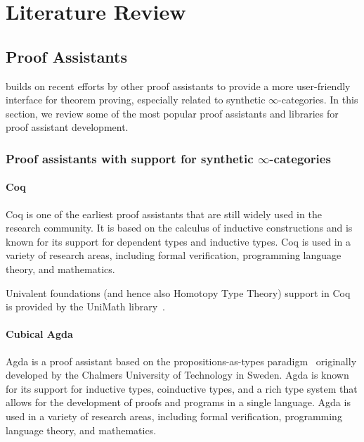 \chapter{Literature Review}
\label{chap:lr}

\section{Proof Assistants}

\Rzk{} builds on recent efforts by other proof assistants to provide a more user-friendly interface for theorem proving,
especially related to synthetic $\infty$-categories.
In this section, we review some of the most popular proof assistants and libraries for proof assistant development.

\subsection{Proof assistants with support for synthetic $\infty$-categories}

\subsubsection{Coq}

Coq \cite{huet1997coq} is one of the earliest proof assistants that are still widely used in the research community.
It is based on the calculus of inductive constructions and is known for its support for dependent types and inductive types.
Coq is used in a variety of research areas, including formal verification, programming language theory, and mathematics.

Univalent foundations (and hence also Homotopy Type Theory) support in Coq is provided by the UniMath library~\cite{DanielGrayson2024}\cite{MacPherson2019}.

\subsubsection{Cubical Agda}

Agda \cite{BoveDybjerNorell2009} is a proof assistant based on the propositions-as-types paradigm~\cite{Wadler2015} originally developed by the Chalmers University of Technology in Sweden.
Agda is known for its support for inductive types, coinductive types, and a rich type system that allows for the
development of proofs and programs in a single language.
Agda is used in a variety of research areas, including formal verification, programming language theory, and mathematics.

